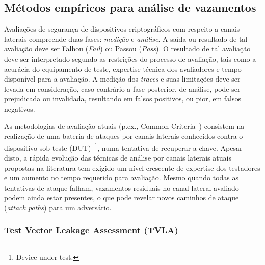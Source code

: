 \documentclass{SBCbookchapter}
\begin{document}

%

\subsection{Métodos empíricos para análise de vazamentos}


Avaliações de segurança de dispositivos criptográficos com respeito a canais laterais compreende duas fases: \textit{medição} e \textit{análise}.
%
A saída ou resultado de tal avaliação deve ser Falhou (\textit{Fail}) ou Passou (\textit{Pass}). 
%
O resultado de tal avaliação deve ser interpretado segundo as restrições do processo de avaliação, tais como a acurácia do equipamento de teste, expertise técnica dos avaliadores e tempo disponível para a avaliação.
%
A medição dos \emph{traces} e suas limitações deve ser levada em consideração, caso contrário a fase posterior, de análise, pode ser prejudicada ou invalidada, resultando em falsos positivos, ou pior, em falsos negativos.

As metodologias de avaliação atuais (p.ex., Common Criteria~\cite{CommonCriteria2014}) consistem na realização de uma bateria de ataques por canais laterais conhecidos contra o dispositivo sob teste (DUT)~\footnote{Device under test.}, numa tentativa de recuperar a chave. Apesar disto, a rápida evolução das técnicas de análise por canais laterais atuais propostas na literatura tem exigido um nível crescente de expertise dos testadores e um aumento no tempo requerido para avaliação. Mesmo quando todas as tentativas de ataque falham, vazamentos residuais no canal lateral avaliado podem ainda estar presentes, o que pode revelar novos caminhos de ataque (\textit{attack paths}) para um adversário.
%
\subsubsection{Test Vector Leakage Assessment (TVLA)}\label{sec-tvla}
\end{document}
